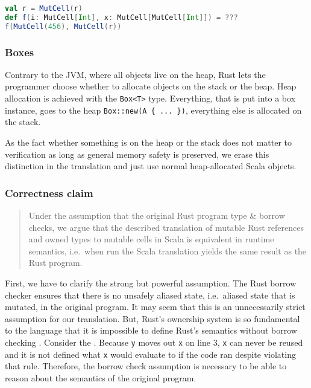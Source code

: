 \begin{lstlisting}[language=Scala]
val r = MutCell(r)
def f(i: MutCell[Int], x: MutCell[MutCell[Int]]) = ???
f(MutCell(456), MutCell(r))
\end{lstlisting}

\subsubsection{Boxes}

Contrary to the JVM, where all objects live on the heap, Rust lets the
programmer choose whether to allocate objects on the stack or the heap.
Heap allocation is achieved with the \passthrough{\lstinline!Box<T>!}
type. Everything, that is put into a box instance, goes to the heap
\passthrough{\lstinline!Box::new(A \{ ... \})!}, everything else is
allocated on the stack.

As the fact whether something is on the heap or the stack does not
matter to verification as long as general memory safety is preserved, we
erase this distinction in the translation and just use normal
heap-allocated Scala objects.

\subsubsection{Correctness claim}

\begin{quote}
Under the assumption that the original Rust program type \& borrow
checks, we argue that the described translation of mutable Rust
references and owned types to mutable cells in Scala is equivalent in
runtime semantics, i.e.~when run the Scala translation yields the same
result as the Rust program.
\end{quote}

First, we have to clarify the strong but powerful assumption. The Rust
borrow checker ensures that there is no unsafely aliased state,
i.e.~aliased state that is mutated, in the original program. It may seem
that this is an unnecessarily strict assumption for our translation.
But, Rust's ownership system is so fundamental to the language that it
is impossible to define Rust's semantics without borrow checking
\cite{krust}. Consider the . Because
\passthrough{\lstinline!y!} moves out \passthrough{\lstinline!x!} on
line 3, \passthrough{\lstinline!x!} can never be reused and it is not
defined what \passthrough{\lstinline!x!} would evaluate to if the code
ran despite violating that rule. Therefore, the borrow check assumption
is necessary to be able to reason about the semantics of the original
program.

